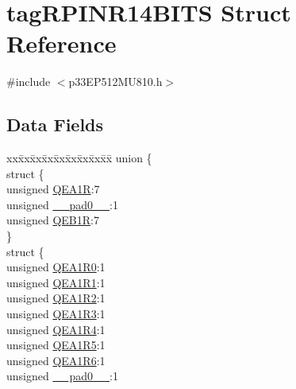 \hypertarget{structtag_r_p_i_n_r14_b_i_t_s}{}\section{tag\+R\+P\+I\+N\+R14\+B\+I\+TS Struct Reference}
\label{structtag_r_p_i_n_r14_b_i_t_s}


{\ttfamily \#include $<$p33\+E\+P512\+M\+U810.\+h$>$}

\subsection*{Data Fields}
\begin{DoxyCompactItemize}
\item 
\begin{tabbing}
xx\=xx\=xx\=xx\=xx\=xx\=xx\=xx\=xx\=\kill
union \{\\
\>struct \{\\
\>\>unsigned \hyperlink{structtag_r_p_i_n_r14_b_i_t_s_a86177b0664bf0f1bad80b95a9a5b794a}{QEA1R}:7\\
\>\>unsigned \hyperlink{structtag_r_p_i_n_r14_b_i_t_s_adf71f3d8410c1f1dbbc96680a92c49af}{\_\_pad0\_\_}:1\\
\>\>unsigned \hyperlink{structtag_r_p_i_n_r14_b_i_t_s_a922a398c1f2c821cf26eddb9a2a2cbf7}{QEB1R}:7\\
\>\} \\
\>struct \{\\
\>\>unsigned \hyperlink{structtag_r_p_i_n_r14_b_i_t_s_a55d9d44ea18460493b784d295a73e0af}{QEA1R0}:1\\
\>\>unsigned \hyperlink{structtag_r_p_i_n_r14_b_i_t_s_ae653846c0fad84e8af229b79b3950459}{QEA1R1}:1\\
\>\>unsigned \hyperlink{structtag_r_p_i_n_r14_b_i_t_s_a846633fb16a58591a87c66b632a9cb6c}{QEA1R2}:1\\
\>\>unsigned \hyperlink{structtag_r_p_i_n_r14_b_i_t_s_a856746d04efb0655f2e9a4fb66158721}{QEA1R3}:1\\
\>\>unsigned \hyperlink{structtag_r_p_i_n_r14_b_i_t_s_afed236c4f14258eacc5890963200d4db}{QEA1R4}:1\\
\>\>unsigned \hyperlink{structtag_r_p_i_n_r14_b_i_t_s_a36bc32fc03bf4d25fe67c09b5d9fa263}{QEA1R5}:1\\
\>\>unsigned \hyperlink{structtag_r_p_i_n_r14_b_i_t_s_ad6c453adf75ed4d282d24aa46d718ea3}{QEA1R6}:1\\
\>\>unsigned \hyperlink{structtag_r_p_i_n_r14_b_i_t_s_adf71f3d8410c1f1dbbc96680a92c49af}{\_\_pad0\_\_}:1\\

\end{tabbing}
\end{DoxyCompactItemize}
